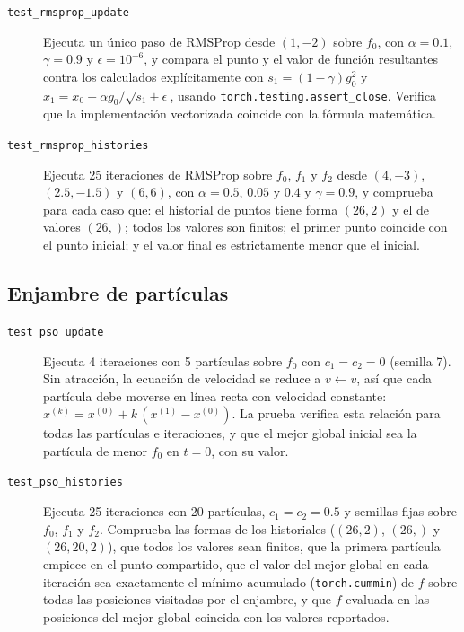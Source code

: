 \begin{description}
    \item[\texttt{test\_rmsprop\_update}] Ejecuta un único paso de
    RMSProp desde $(1,-2)$ sobre $f_0$, con $\alpha=0.1$, $\gamma=0.9$ y
    $\epsilon=10^{-6}$, y compara el punto y el valor de función
    resultantes contra los calculados explícitamente con
    $s_1=(1-\gamma)g_0^2$ y $x_1=x_0-\alpha g_0/\sqrt{s_1+\epsilon}$, usando
    \texttt{torch.testing.assert\_close}. Verifica que la implementación
    vectorizada coincide con la fórmula matemática.
    \item[\texttt{test\_rmsprop\_histories}] Ejecuta 25 iteraciones de
    RMSProp sobre $f_0$, $f_1$ y $f_2$ desde $(4,-3)$, $(2.5,-1.5)$ y
    $(6,6)$, con $\alpha=0.5$, $0.05$ y $0.4$ y $\gamma=0.9$, y comprueba
    para cada caso que: el historial de puntos tiene forma $(26,2)$ y el de
    valores $(26,)$; todos los valores son finitos; el primer punto coincide
    con el punto inicial; y el valor final es estrictamente menor que el
    inicial.
\end{description}

\subsection{Enjambre de partículas}

\begin{description}
    \item[\texttt{test\_pso\_update}] Ejecuta 4 iteraciones con 5
    partículas sobre $f_0$ con $c_1=c_2=0$ (semilla 7). Sin atracción, la
    ecuación de velocidad se reduce a $v\leftarrow v$, así que cada
    partícula debe moverse en línea recta con velocidad constante:
    $x^{(k)}=x^{(0)}+k\,(x^{(1)}-x^{(0)})$. La prueba verifica esta relación
    para todas las partículas e iteraciones, y que el mejor global inicial
    sea la partícula de menor $f_0$ en $t=0$, con su valor.
    \item[\texttt{test\_pso\_histories}] Ejecuta 25 iteraciones con 20
    partículas, $c_1=c_2=0.5$ y semillas fijas sobre $f_0$, $f_1$ y $f_2$.
    Comprueba las formas de los historiales ($(26,2)$, $(26,)$ y
    $(26,20,2)$), que todos los valores sean finitos, que la primera
    partícula empiece en el punto compartido, que el valor del mejor global
    en cada iteración sea exactamente el mínimo acumulado
    (\texttt{torch.cummin}) de $f$ sobre todas las posiciones visitadas por
    el enjambre, y que $f$ evaluada en las posiciones del mejor global
    coincida con los valores reportados.
\end{description}
